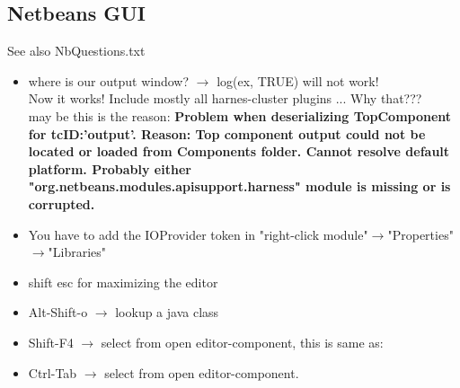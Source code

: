 \documentclass[12pt]{article}
\begin{document}
\subsection{Netbeans GUI}
See also NbQuestions.txt\\
\begin{itemize}
\item where is our output window? $\rightarrow$ log(ex, TRUE) will not work!\\
Now it works! Include mostly all harnes-cluster plugins ... Why that???\\
may be this is the reason:  
{\bf Problem when deserializing TopComponent for tcID:'output'. Reason: Top component output could not be located or loaded from Components folder. Cannot resolve default platform. Probably either "org.netbeans.modules.apisupport.harness" module is missing or is corrupted.}
\item You have to add the IOProvider token in "right-click module"$\rightarrow$"Properties"$\rightarrow$"Libraries"\\
\item shift esc for maximizing the editor
\item Alt-Shift-o $\rightarrow$ lookup a java class
\item Shift-F4    $\rightarrow$ select from open editor-component, this is same as:
\item Ctrl-Tab    $\rightarrow$ select from open editor-component.
\end{itemize}
\end{document}
